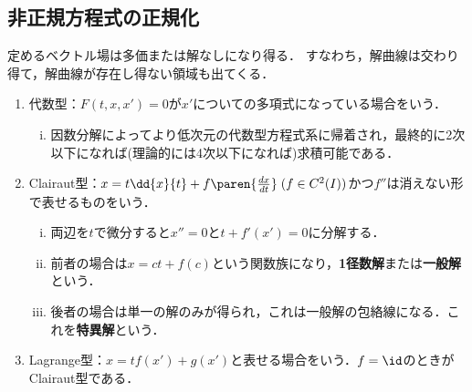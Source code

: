 \documentclass[uplatex,dvipdfmx]{jsreport}
\begin{document}
\subsection{非正規方程式の正規化}

\begin{tcolorbox}[colframe=ForestGreen, colback=ForestGreen!10!white,breakable,colbacktitle=ForestGreen!40!white,coltitle=black,fonttitle=\bfseries\sffamily,
    title=]
    定めるベクトル場は多価または解なしになり得る．
    すなわち，解曲線は交わり得て，解曲線が存在し得ない領域も出てくる．
\end{tcolorbox}

\begin{example}\mbox{}
    \begin{enumerate}
        \item 代数型：$F(t,x,x')=0$が$x'$についての多項式になっている場合をいう．
        \begin{enumerate}[(i)]
            \item 因数分解によってより低次元の代数型方程式系に帰着され，最終的に2次以下になれば(理論的には4次以下になれば)求積可能である．
        \end{enumerate}
        \item Clairaut型：$x=t\dd{x}{t}+f\paren{\frac{dx}{dt}}\;(f\in C^2(I))$かつ$f''$は消えない形で表せるものをいう．
        \begin{enumerate}[(i)]
            \item 両辺を$t$で微分すると$x''=0$と$t+f'(x')=0$に分解する．
            \item 前者の場合は$x=ct+f(c)$という関数族になり，\textbf{1径数解}または\textbf{一般解}という．
            \item 後者の場合は単一の解のみが得られ，これは一般解の包絡線になる．これを\textbf{特異解}という．
        \end{enumerate}
        \item Lagrange型：$x=tf(x')+g(x')$と表せる場合をいう．$f=\id$のときがClairaut型である．
    \end{enumerate}
\end{example}
\end{document}
